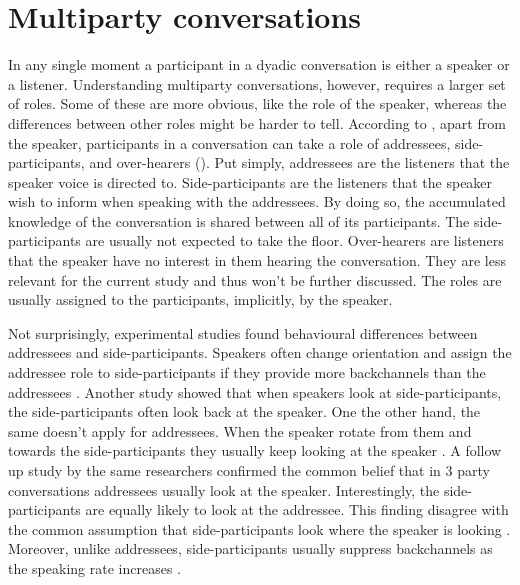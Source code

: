\documentclass[]{simple-thesis}
\begin{document}
\section{Multiparty conversations}

In any single moment a participant in a dyadic conversation is either a speaker or a listener.
Understanding multiparty conversations, however, requires a larger set of roles.
Some of these are more obvious, like the role of the speaker, whereas the differences between other roles might be harder to tell.
According to \citeauthor{Clark1982}, apart from the speaker, participants in a conversation can take a role of addressees, side-participants, and over-hearers (\citeyear{Clark1982}).
Put simply, addressees are the listeners that the speaker voice is directed to.
Side-participants are the listeners that the speaker wish to inform when speaking with the addressees.
By doing so, the accumulated knowledge of the conversation is shared between all of its participants.
The side-participants are usually not expected to take the floor.
Over-hearers are listeners that the speaker have no interest in them hearing the conversation.
They are less relevant for the current study and thus won't be further discussed.
The roles are usually assigned to the participants, implicitly, by the speaker.

Not surprisingly, experimental studies found behavioural differences between addressees and side-participants.
Speakers often change orientation and assign the addressee role to side-participants if they provide more backchannels than the addressees \citep{Goodwin1979}.
Another study showed that when speakers look at side-participants, the side-participants often look back at the speaker.
One the other hand, the same doesn't apply for addressees.
When the speaker rotate from them and towards the side-participants they usually keep looking at the speaker \citep{Healey2009}.
A follow up study by the same researchers confirmed the common belief that in 3 party conversations addressees usually look at the speaker.
Interestingly, the side-participants are equally likely to look at the addressee.
This finding disagree with the common assumption that side-participants look where the speaker is looking \citep{Battersby2010}.
Moreover, unlike addressees, side-participants usually suppress backchannels as the speaking rate increases \citep{Healey2013}.
\end{document}
